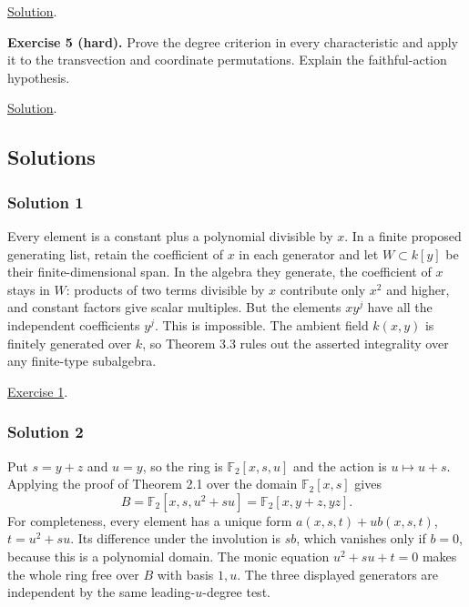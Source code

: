 \documentclass[
]{article}
\begin{document}
\hyperref[solution-4]{Solution}.

\protect{}\label{exercise-5}{}

\textbf{Exercise 5 (hard).} Prove the degree criterion in every
characteristic and apply it to the transvection and coordinate
permutations. Explain the faithful-action hypothesis.

\hyperref[solution-5]{Solution}.

\subsection{Solutions}\label{solutions}

\subsubsection{Solution 1}\label{solution-1}

Every element is a constant plus a polynomial divisible by \(x\). In a
finite proposed generating list, retain the coefficient of \(x\) in each
generator and let \(W\subset k [y]\) be their finite-dimensional span.
In the algebra they generate, the coefficient of \(x\) stays in \(W\):
products of two terms divisible by \(x\) contribute only \(x^2\) and
higher, and constant factors give scalar multiples. But the elements
\(xy^j\) have all the independent coefficients \(y^j\). This is
impossible. The ambient field \(k(x,y)\) is finitely generated over
\(k\), so Theorem 3.3 rules out the asserted integrality over any
finite-type subalgebra.

\hyperref[exercise-1]{Exercise 1}.

\subsubsection{Solution 2}\label{solution-2}

Put \(s=y+z\) and \(u=y\), so the ring is \(\mathbb F_2 [x,s,u]\) and
the action is \(u\mapsto u+s\). Applying the proof of Theorem 2.1 over
the domain \(\mathbb F_2 [x,s]\) gives \[
B=\mathbb F_2 [x,s,u^2+su]=\mathbb F_2 [x,y+z,yz].
\] For completeness, every element has a unique form
\(a(x,s,t)+u b(x,s,t)\), \(t=u^2+su\). Its difference under the
involution is \(sb\), which vanishes only if \(b=0\), because this is a
polynomial domain. The monic equation \(u^2+su+t=0\) makes the whole
ring free over \(B\) with basis \(1,u\). The three displayed generators
are independent by the same leading-\(u\)-degree test.
\end{document}
